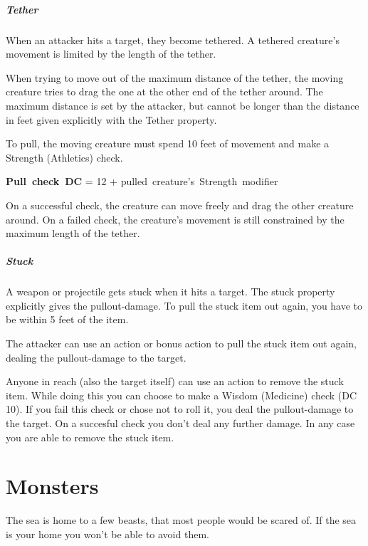 \documentclass[letterpaper,twocolumn,openany,nodeprecatedcode]{dndbook}
\begin{document}
\subparagraph{Tether}
When an attacker hits a target, they become tethered.
A tethered creature's movement is limited by the length of the tether.

When trying to move out of the maximum distance of the tether, the moving creature tries to drag the one at the other end of the tether around.
The maximum distance is set by the attacker, but cannot be longer than the distance in feet given explicitly with the Tether property.

To pull, the moving creature must spend 10 feet of movement and make a Strength (Athletics) check.

\begin{center}
    \mbox{\bf Pull check DC} = \mbox{12} + \mbox{pulled creature's Strength modifier}
\end{center}

On a successful check, the creature can move freely and drag the other creature around.
On a failed check, the creature's movement is still constrained by the maximum length of the tether.

\subparagraph{Stuck}
A weapon or projectile gets stuck when it hits a target.
The stuck property explicitly gives the pullout-damage.
To pull the stuck item out again, you have to be within 5 feet of the item.

The attacker can use an action or bonus action to pull the stuck item out again, dealing the pullout-damage to the target.

Anyone in reach (also the target itself) can use an action to remove the stuck item.
While doing this you can choose to make a Wisdom (Medicine) check (DC 10).
If you fail this check or chose not to roll it, you deal the pullout-damage to the target.
On a succesful check you don't deal any further damage.
In any case you are able to remove the stuck item.

\section{Monsters}
The sea is home to a few beasts, that most people would be scared of.
If the sea is your home you won't be able to avoid them.
\end{document}
